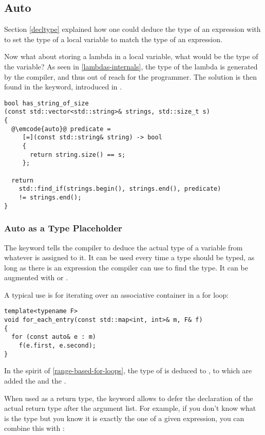 \subsection{Auto}

Section \ref{decltype} explained how one could deduce the type of an
expression with  to set the type of a local variable
to match the type of an expression.

Now what about storing a lambda in a local variable, what would be the
type of the variable? As seen in \ref{lambdas-internals}, the type of
the lambda is generated by the compiler, and thus out of reach for the
programmer. The solution is then found in the  keyword,
introduced in .

\begin{lstlisting}
bool has_string_of_size
(const std::vector<std::string>& strings, std::size_t s)
{
  @\emcode{auto}@ predicate =
     [=](const std::string& string) -> bool
     {
       return string.size() == s;
     };

  return
    std::find_if(strings.begin(), strings.end(), predicate)
    != strings.end();
}
\end{lstlisting}

\subsubsection{Auto as a Type Placeholder}

The  keyword tells the compiler to deduce the actual type
of a variable from whatever is assigned to it. It can be used every
time a type should be typed, as long as there is an expression the
compiler can use to find the type. It can be augmented with
 or \code{\&}.

A typical use is for iterating over an associative container in a for
loop:

\begin{lstlisting}
template<typename F>
void for_each_entry(const std::map<int, int>& m, F& f)
{
  for (const auto& e : m)
    f(e.first, e.second);
}
\end{lstlisting}

In the spirit of \ref{range-based-for-loops}, the type of  is
deduced to , to which are added the 
and the \code{\&}.

When used as a return type, the  keyword allows to defer
the declaration of the actual return type after the argument list. For
example, if you don't know what is the type but you know it is exactly
the one of a given expression, you can combine this with
:

